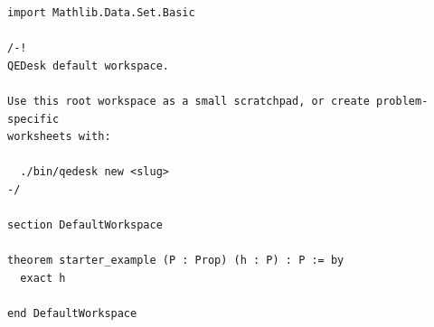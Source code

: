 \documentclass[11pt]{article}
\begin{document}
\begin{verbatim}
import Mathlib.Data.Set.Basic

/-!
QEDesk default workspace.

Use this root workspace as a small scratchpad, or create problem-specific
worksheets with:

  ./bin/qedesk new <slug>
-/

section DefaultWorkspace

theorem starter_example (P : Prop) (h : P) : P := by
  exact h

end DefaultWorkspace
\end{verbatim}
\end{document}
